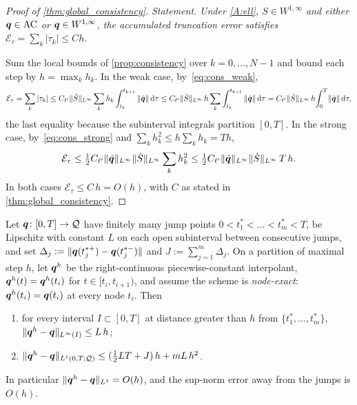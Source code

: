 \begin{proof}[Proof of \cref{thm:global_consistency}]
\emph{Statement.} \emph{Under \ref{A:ell}, $S\in W^{1,\infty}$ and
either $\bm{q}\in\mathrm{AC}$ or $\bm{q}\in W^{1,\infty}$, the accumulated
truncation error satisfies $\mathcal E_\tau=\sum_k|\tau_k|\le Ch$.}

\smallskip
Sum the local bounds of \cref{prop:consistency} over $k=0,\dots,N-1$ and
bound each step by $h=\max_k h_k$. In the weak case,
by~\eqref{eq:cons_weak},
\[
  \mathcal E_\tau=\sum_{k}|\tau_k|
  \le C_{\ell'}\|\dot S\|_{L^\infty}\sum_k h_k\int_{t_k}^{t_{k+1}}\|\dot{\bm{q}}\|\mathop{}\!\mathrm{d}\tau
  \le C_{\ell'}\|\dot S\|_{L^\infty}\,h\sum_k\int_{t_k}^{t_{k+1}}\|\dot{\bm{q}}\|\mathop{}\!\mathrm{d}\tau
  = C_{\ell'}\|\dot S\|_{L^\infty}\,h\!\int_0^T\!\|\dot{\bm{q}}\|\mathop{}\!\mathrm{d}\tau,
\]
the last equality because the subinterval integrals partition $[0,T]$.
In the strong case, by~\eqref{eq:cons_strong} and $\sum_k h_k^2\le h\sum_k h_k=Th$,
\[
  \mathcal E_\tau\le\tfrac12 C_{\ell'}\|\dot{\bm{q}}\|_{L^\infty}\|\dot S\|_{L^\infty}\sum_k h_k^2
  \le\tfrac12 C_{\ell'}\|\dot{\bm{q}}\|_{L^\infty}\|\dot S\|_{L^\infty}\,T\,h .
\]
In both cases $\mathcal E_\tau\le C\,h=O(h)$, with $C$ as stated in
\cref{thm:global_consistency}.
\end{proof}

\begin{proposition}\label{prop:interp}
Let $\bm{q}\colon[0,T]\to\mathcal{Q}$ have finitely many jump points
$0<t^\ast_1<\dots<t^\ast_m<T$, be Lipschitz with constant $L$ on each
open subinterval between consecutive jumps, and set
$\Delta_j:=\|\bm{q}(t^{\ast+}_j)-\bm{q}(t^{\ast-}_j)\|$ and
$J:=\sum_{j=1}^m\Delta_j$. On a partition of maximal step $h$, let
$\bm{q}^h$ be the right-continuous piecewise-constant interpolant,
$\bm{q}^h(t)=\bm{q}^h(t_i)$ for $t\in[t_i,t_{i+1})$, and assume the scheme
is \emph{node-exact}: $\bm{q}^h(t_i)=\bm{q}(t_i)$ at every node $t_i$. Then
\begin{enumerate}[label=\textnormal{(\roman*)},leftmargin=2.4em,itemsep=2pt]
  \item\label{interp:sup} for every interval $I\subset[0,T]$ at distance
  greater than $h$ from $\{t^\ast_1,\dots,t^\ast_m\}$,
  $\|\bm{q}^h-\bm{q}\|_{L^\infty(I)}\le L\,h$;
  \item\label{interp:L1} $\|\bm{q}^h-\bm{q}\|_{L^1(0,T;\mathcal{Q})}\le(\tfrac12 LT+J)\,h+mL\,h^2$.
\end{enumerate}
In particular $\|\bm{q}^h-\bm{q}\|_{L^1}=O(h)$, and the sup-norm error away
from the jumps is $O(h)$.
\end{proposition}

